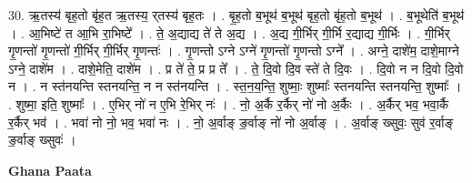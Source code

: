\documentclass[17pt]{extarticle}
\begin{document}
30. ऋ॒तस्य॑ बृह॒तो बृ॑ह॒त ऋ॒तस्य॒ र्‌तस्य॑ बृह॒तः । . बृ॒ह॒तो ब॒भूथ॑ ब॒भूथ॑ बृह॒तो बृ॑ह॒तो ब॒भूथ॑ । . ब॒भूथेति॑ ब॒भूथ॑ । . आ॒भिष्टे॑ त आ॒भि रा॒भिष्टे᳚ । . ते॒ अ॒द्याद्य ते॑ ते अ॒द्य । . अ॒द्य गी॒र्भिर् गी॒र्भि र॒द्याद्य गी॒र्भिः । . गी॒र्भिर् गृ॒णन्तो॑ गृ॒णन्तो॑ गी॒र्भिर् गी॒र्भिर् गृ॒णन्तः॑ । . गृ॒णन्तो ऽग्ने ऽग्ने॑ गृ॒णन्तो॑ गृ॒णन्तो ऽग्ने᳚ । . अग्ने॒ दाशे॑म॒ दाशे॒माग्ने ऽग्ने॒ दाशे॑म । . दाशे॒मेति॒ दाशे॑म । . प्र ते॑ ते॒ प्र प्र ते᳚ । . ते॒ दि॒वो दि॒व स्ते॑ ते दि॒वः । . दि॒वो न न दि॒वो दि॒वो न । . न स्त॑नयन्ति स्तनयन्ति॒ न न स्त॑नयन्ति । . स्त॒न॒य॒न्ति॒ शुष्माः॒ शुष्माः᳚ स्तनयन्ति स्तनयन्ति॒ शुष्माः᳚ । . शुष्मा॒ इति॒ शुष्माः᳚ । . ए॒भिर् नो॑ न ए॒भि रे॒भिर् नः॑ । . नो॒ अ॒र्कै र॒र्कैर् नो॑ नो अ॒र्कैः । . अ॒र्कैर् भव॒ भवा॒र्कै र॒र्कैर् भव॑ । . भवा॑ नो नो॒ भव॒ भवा॑ नः । . नो॒ अ॒र्वाङ् ङ॒र्वाङ् नो॑ नो अ॒र्वाङ् । . अ॒र्वाङ् ख्सुवः॒ सुव॑ र॒र्वाङ् ङ॒र्वाङ् ख्सुवः॑ । \newline

\textbf{Ghana Paata } \newline
\end{document}
